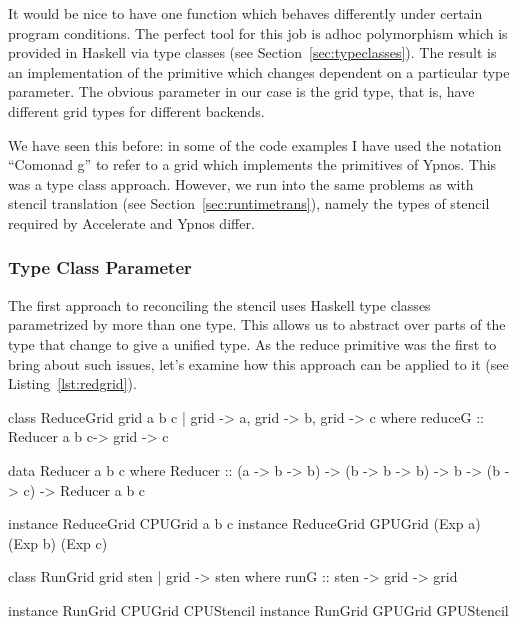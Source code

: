 \documentclass[12pt,a4paper,twoside]{scrbook}
\begin{document}
It would be nice to have one function which behaves differently under certain
program conditions. The perfect tool for this job is adhoc polymorphism which is
provided in Haskell via type classes (see Section~\ref{sec:typeclasses}). The
result is an implementation of the primitive which changes dependent on a
particular type parameter. The obvious parameter in our case is the grid type,
that is, have different grid types for different backends.

We have seen this before: in some of the code examples I have used the notation
``Comonad g'' to refer to a grid which implements the primitives of Ypnos. This
was a type class approach. However, we run into the same problems as with
stencil translation (see Section~\ref{sec:runtimetrans}), namely the types of
stencil required by Accelerate and Ypnos differ.

\subsubsection{Type Class Parameter}

The first approach to reconciling the stencil uses Haskell type classes
parametrized by more than one type. This allows us to abstract over parts of the
type that change to give a unified type. As the reduce primitive was the first
to bring about such issues, let's examine how this approach can be applied to it
(see Listing~\ref{lst:redgrid}).

\begin{hflisting}[label={lst:redgrid}, caption={The \texttt{ReduceGrid} type
class defined with type parameters for each variable: \texttt{a}, \texttt{b} and
\texttt{c}. The \texttt{RunGrid} type class has type parameter \texttt{grid} and
\texttt{sten} where the later is fully determined by the former.}]
class ReduceGrid grid a b c | grid -> a,
                              grid -> b,
                              grid -> c where
    reduceG :: Reducer a b c-> grid -> c

data Reducer a b c where
    Reducer ::   (a -> b -> b)
              -> (b -> b -> b)
              -> b
              -> (b -> c)
              -> Reducer a b c

instance ReduceGrid CPUGrid a b c
instance ReduceGrid GPUGrid (Exp a) (Exp b) (Exp c)

class RunGrid grid sten | grid -> sten where
    runG :: sten -> grid -> grid

instance RunGrid CPUGrid CPUStencil
instance RunGrid GPUGrid GPUStencil
\end{hflisting}
\end{document}
